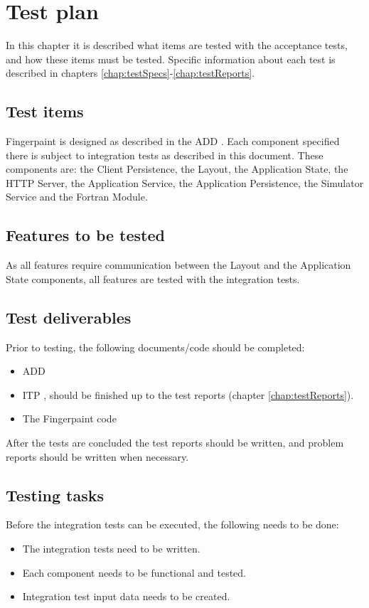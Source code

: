 \chapter{Test plan}
\label{chap:testPlan}
In this chapter it is described what items are tested with the acceptance tests, and how these items must be tested. Specific information about each test is described in chapters \ref{chap:testSpecs}-\ref{chap:testReports}.

\section{Test items}
Fingerpaint is designed as described in the ADD \cite{add}. Each component specified there is subject to integration tests as described in this document. These components are: the Client Persistence, the Layout, the Application State, the HTTP Server, the Application Service, the Application Persistence, the Simulator Service and the Fortran Module.

\section{Features to be tested}
As all features require communication between the Layout and the Application State components, all features are tested with the integration tests.

\section{Test deliverables}
Prior to testing, the following documents/code should be completed:
\begin{itemize}
\item ADD \cite{add}
\item ITP \cite{itp}, should be finished up to the test reports (chapter \ref{chap:testReports}).
\item The Fingerpaint code
\end{itemize}
After the tests are concluded the test reports should be written, and problem reports should be written when necessary.

\section{Testing tasks}
Before the integration tests can be executed, the following needs to be done:
\begin{itemize}
\item The integration tests need to be written.
\item Each component needs to be functional and tested.
\item Integration test input data needs to be created.
\end{itemize}

